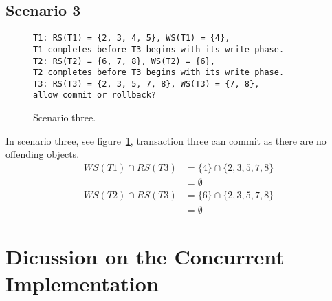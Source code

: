 \documentclass[a4paper]{article}
\begin{document}
\subsection*{Scenario 3}
\begin{figure}[h!]
\texttt{T1: RS(T1) = \{2, 3, 4, 5\}, WS(T1) = \{4\},\\
T1 completes before T3 begins with its write phase.\\
T2: RS(T2) = \{6, 7, 8\}, WS(T2) = \{6\},\\
T2 completes before T3 begins with its write phase.\\
T3: RS(T3) = \{2, 3, 5, 7, 8\}, WS(T3) = \{7, 8\},\\
allow commit or rollback?}
\caption{Scenario three.}
\label{sc3}
\end{figure}
In scenario three, see figure~\ref{sc3}, transaction three can commit as there are no offending objects.
\begin{align}
WS(T1) \cap RS(T3) &= \{4\} \cap \{2, 3, 5, 7, 8\}\\
&= \emptyset\\
WS(T2) \cap RS(T3) &= \{6\} \cap \{2, 3, 5, 7, 8\}\\
&= \emptyset
\end{align}

\section{Dicussion on the Concurrent Implementation}
\end{document}

